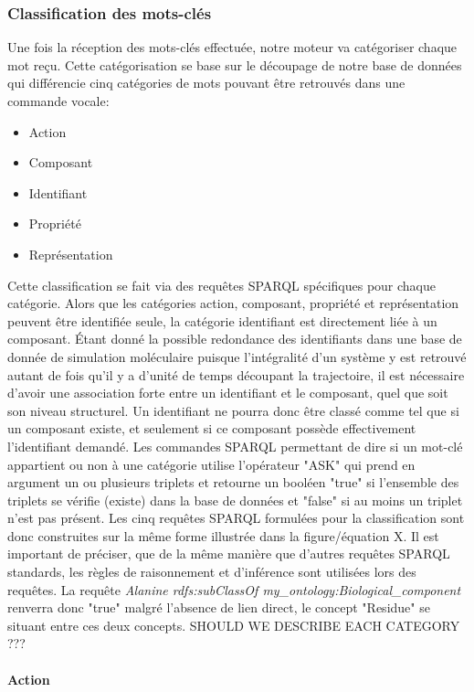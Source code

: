 \subsubsection{Classification des mots-clés}

Une fois la réception des mots-clés effectuée, notre moteur va catégoriser chaque mot reçu. Cette catégorisation se base sur le découpage de notre base de données qui différencie cinq catégories de mots pouvant être retrouvés dans une commande vocale:
\begin{itemize}
	\item Action
	\item Composant
	\item Identifiant
	\item Propriété
	\item Représentation
\end{itemize}

Cette classification se fait via des requêtes SPARQL spécifiques pour chaque catégorie. Alors que les catégories action, composant, propriété et représentation peuvent être identifiée seule, la catégorie identifiant est directement liée à un composant. Étant donné la possible redondance des identifiants dans une base de donnée de simulation moléculaire puisque l'intégralité d'un système y est retrouvé autant de fois qu'il y a d'unité de temps découpant la trajectoire, il est nécessaire d'avoir une association forte entre un identifiant et le composant, quel que soit son niveau structurel. Un identifiant ne pourra donc être classé comme tel que si un composant existe, et seulement si ce composant possède effectivement l'identifiant demandé. Les commandes SPARQL permettant de dire si un mot-clé appartient ou non à une catégorie utilise l'opérateur "ASK" qui prend en argument un ou plusieurs triplets et retourne un booléen "true" si l'ensemble des triplets se vérifie (existe) dans la base de données et "false" si au moins un triplet n'est pas présent. Les cinq requêtes SPARQL formulées pour la classification sont donc construites sur la même forme illustrée dans la figure/équation X. Il est important de préciser, que de la même manière que d'autres requêtes SPARQL standards, les règles de raisonnement et d'inférence sont utilisées lors des requêtes. La requête \textit{Alanine rdfs:subClassOf my\_ontology:Biological\_component} renverra donc "true" malgré l'absence de lien direct, le concept "Residue" se situant entre ces deux concepts.
SHOULD WE DESCRIBE EACH CATEGORY ???

\paragraph{Action}

